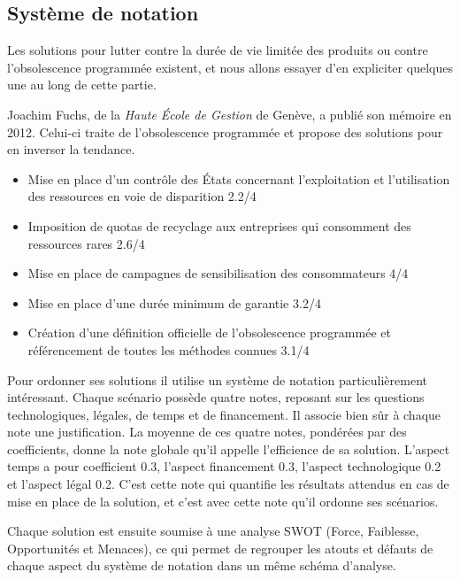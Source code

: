 \subsection{Système de notation}

Les solutions pour lutter contre la durée de vie limitée des produits ou contre l’obsolescence programmée existent, et nous allons essayer d’en expliciter quelques une au long de  cette partie.

Joachim Fuchs, de la \textit{Haute École de Gestion} de Genève, a publié son mémoire en 2012. Celui-ci traite de l'obsolescence programmée et propose des solutions pour en inverser la tendance.

\begin{itemize}
\item Mise en place d’un contrôle des États concernant l’exploitation et l’utilisation des ressources en voie de disparition 2.2/4
\item Imposition de quotas de recyclage aux entreprises qui consomment des ressources rares 2.6/4
\item Mise en place de campagnes de sensibilisation des consommateurs 4/4
\item Mise en place d’une durée minimum de garantie 3.2/4
\item Création d’une définition officielle de l’obsolescence programmée et référencement de toutes les méthodes connues 3.1/4
\end{itemize}

Pour ordonner ses solutions il utilise un système de notation particulièrement intéressant. Chaque scénario possède quatre notes, reposant sur les questions technologiques, légales, de temps et de financement. Il associe bien sûr à chaque note une justification.
La moyenne de ces quatre notes, pondérées par des coefficients, donne la note globale qu’il appelle l’efficience de sa solution. L’aspect temps a pour coefficient 0.3, l’aspect financement 0.3, l’aspect technologique 0.2 et l’aspect légal 0.2. C’est cette note qui quantifie les résultats attendus en cas de mise en place de la solution, et c’est avec cette note qu’il ordonne ses scénarios.

Chaque solution est ensuite soumise à une analyse SWOT (Force, Faiblesse, Opportunités et Menaces), ce qui permet de regrouper les atouts et défauts de chaque aspect du système de notation dans un même schéma d’analyse. 
